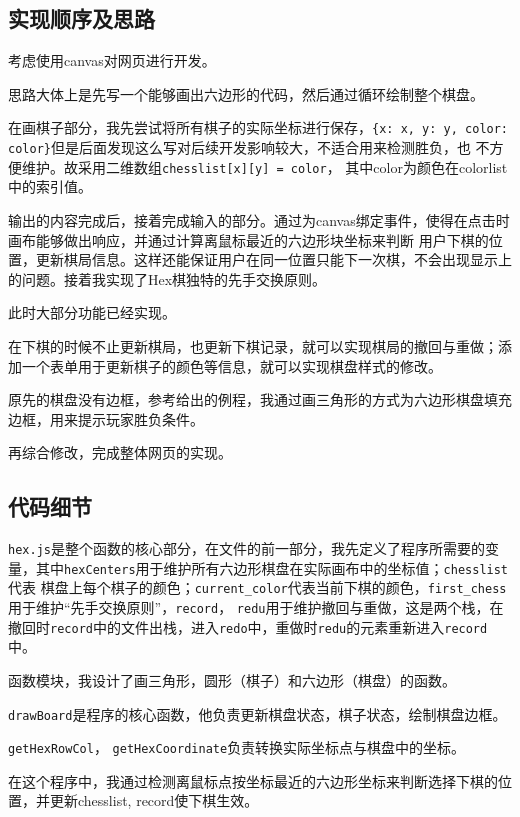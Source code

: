 \setcounter{section}{3}
\subsection{实现顺序及思路}
考虑使用canvas对网页进行开发。

思路大体上是先写一个能够画出六边形的代码，然后通过循环绘制整个棋盘。

在画棋子部分，我先尝试将所有棋子的实际坐标进行保存，\verb|{x: x, y: y, color: color}|但是后面发现这么写对后续开发影响较大，不适合用来检测胜负，也
不方便维护。故采用二维数组\verb|chesslist[x][y] = color|， 其中color为颜色在colorlist中的索引值。

输出的内容完成后，接着完成输入的部分。通过为canvas绑定事件，使得在点击时画布能够做出响应，并通过计算离鼠标最近的六边形块坐标来判断
用户下棋的位置，更新棋局信息。这样还能保证用户在同一位置只能下一次棋，不会出现显示上的问题。接着我实现了Hex棋独特的先手交换原则。

此时大部分功能已经实现。

在下棋的时候不止更新棋局，也更新下棋记录，就可以实现棋局的撤回与重做；添加一个表单用于更新棋子的颜色等信息，就可以实现棋盘样式的修改。

原先的棋盘没有边框，参考给出的例程，我通过画三角形的方式为六边形棋盘填充边框，用来提示玩家胜负条件。

再综合修改，完成整体网页的实现。

\subsection{代码细节}
\verb|hex.js|是整个函数的核心部分，在文件的前一部分，我先定义了程序所需要的变量，其中\verb|hexCenters|用于维护所有六边形棋盘在实际画布中的坐标值；\verb|chesslist|代表
棋盘上每个棋子的颜色；\verb|current_color|代表当前下棋的颜色，\verb|first_chess|用于维护``先手交换原则''，\verb|record|， \verb|redu|用于维护撤回与重做，这是两个栈，在撤回时\verb|record|中的文件出栈，进入\verb|redo|中，重做时\verb|redu|的元素重新进入\verb|record|中。

函数模块，我设计了画三角形，圆形（棋子）和六边形（棋盘）的函数。

\verb|drawBoard|是程序的核心函数，他负责更新棋盘状态，棋子状态，绘制棋盘边框。

\verb|getHexRowCol|， \verb|getHexCoordinate|负责转换实际坐标点与棋盘中的坐标。

在这个程序中，我通过检测离鼠标点按坐标最近的六边形坐标来判断选择下棋的位置，并更新chesslist, record使下棋生效。

